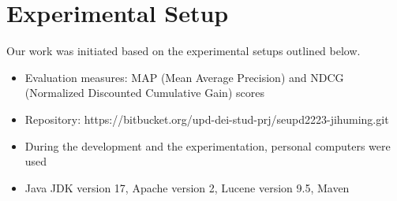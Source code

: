 \section{Experimental Setup}
\label{sec:setup}

Our work was initiated based on the experimental setups outlined below.
\begin{itemize}
	\item Evaluation measures: MAP (Mean Average Precision) and NDCG (Normalized Discounted Cumulative Gain) scores
	\item Repository: https://bitbucket.org/upd-dei-stud-prj/seupd2223-jihuming.git 
	\item During the development and the experimentation, personal computers were used
	\item Java JDK version 17, Apache version 2, Lucene version 9.5, Maven
\end{itemize}